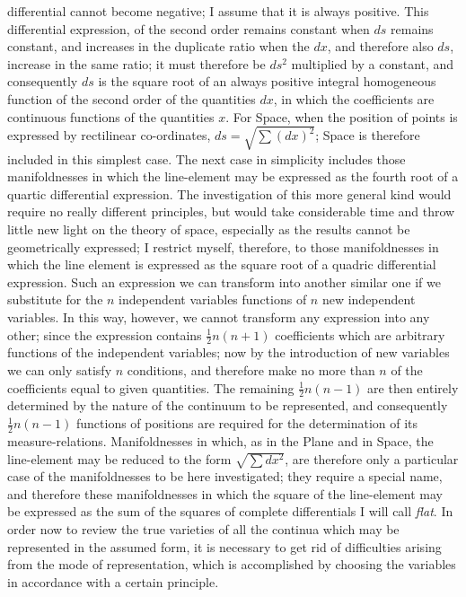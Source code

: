 \documentclass[a4paper,12pt]{article}
\begin{document}
differential cannot become negative; I assume that it is always
positive.  This differential expression, of the second order
remains constant when $ds$ remains constant, and increases in the
duplicate ratio when the $dx$, and therefore also $ds$, increase
in the same ratio; it must therefore be $ds^2$ multiplied by a
constant, and consequently $ds$ is the square root of an always
positive integral homogeneous function of the second order of the
quantities $dx$, in which the coefficients are continuous
functions of the quantities $x$.  For Space, when the position of
points is expressed by rectilinear co-ordinates,
$ds = \sqrt{\sum (dx)^2}$; Space is therefore included in this
simplest case.  The next case in simplicity includes those
manifoldnesses in which the line-element may be expressed as the
fourth root of a quartic differential expression.  The
investigation of this more general kind would require no really
different principles, but would take considerable time and
throw little new light on the theory of space, especially as the
results cannot be geometrically expressed; I restrict myself,
therefore, to those manifoldnesses in which the line element is
expressed as the square root of a quadric differential
expression.  Such an expression we can transform into another
similar one if we substitute for the $n$ independent variables
functions of $n$ new independent variables.  In this way,
however, we cannot transform any expression into any other; since
the expression contains
$\frac{1}{2} n (n + 1)$ coefficients which are arbitrary
functions of the independent variables; now by the introduction
of new variables we can only satisfy $n$ conditions, and
therefore make no more than $n$ of the coefficients equal to
given quantities.  The remaining $\frac{1}{2} n (n - 1)$ are then
entirely determined by the nature of the continuum to be
represented, and consequently $\frac{1}{2} n (n - 1)$ functions
of positions are required for the determination of its
measure-relations.  Manifoldnesses in which, as in the Plane and
in Space, the line-element may be reduced to the form
$\sqrt{\sum dx^2}$, are therefore only a particular case of the
manifoldnesses to be here investigated; they require a special
name, and therefore these manifoldnesses in which the square of
the line-element may be expressed as the sum of the squares of
complete differentials I will call \emph{flat}.  In order now to
review the true varieties of all the continua which may be
represented in the assumed form, it is necessary to get rid of
difficulties arising from the mode of representation, which is
accomplished by choosing the variables in accordance with a
certain principle.
\end{document}
